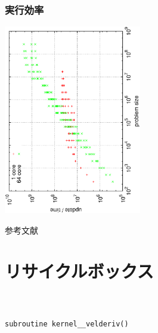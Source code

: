 \documentclass[dvipdfmx,cjk]{beamer}
\begin{document}
\begin{frame}[fragile]\frametitle{実行効率}
\begin{center}
\includegraphics[width=6cm,angle=270]{figure/result-ef.eps}
\end{center}
\end{frame}

\begin{frame}[allowframebreaks]{参考文献}{}
  
  
\end{frame}



% 
% 
% 








\section*{リサイクルボックス}




\subsection{}
\begin{frame}\frametitle{}
\begin{eqnarray}
\end{eqnarray}
\end{frame}


\begin{frame}[fragile]\frametitle{}
\begingroup
    \fontsize{8pt}{9pt}\selectfont
\begin{verbatim}
subroutine kernel__velderiv()
\end{verbatim}
\endgroup
\vspace{-1cm}
\end{frame}
\end{document}
